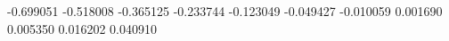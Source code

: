 -0.699051
-0.518008
-0.365125
-0.233744
-0.123049
-0.049427
-0.010059
0.001690
0.005350
0.016202
0.040910
